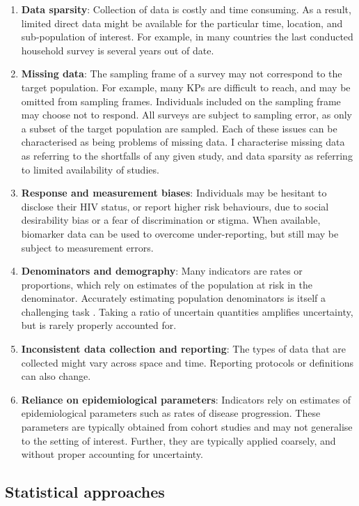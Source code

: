 \documentclass[a4paper, nobind]{templates/ociamthesis}
\providecommand{\tightlist}{%
  \setlength{\itemsep}{0pt}\setlength{\parskip}{0pt}}
\begin{document}
\begin{enumerate}
\def\labelenumi{\arabic{enumi}.}
\tightlist
\item
  \textbf{Data sparsity}:
  Collection of data is costly and time consuming.
  As a result, limited direct data might be available for the particular time, location, and sub-population of interest.
  For example, in many countries the last conducted household survey is several years out of date.
\item
  \textbf{Missing data}:
  The sampling frame of a survey may not correspond to the target population.
  For example, many KPs are difficult to reach, and may be omitted from sampling frames.
  Individuals included on the sampling frame may choose not to respond.
  All surveys are subject to sampling error, as only a subset of the target population are sampled.
  Each of these issues can be characterised as being problems of missing data.
  I characterise missing data as referring to the shortfalls of any given study, and data sparsity as referring to limited availability of studies.
\item
  \textbf{Response and measurement biases}:
  Individuals may be hesitant to disclose their HIV status, or report higher risk behaviours, due to social desirability bias or a fear of discrimination or stigma.
  When available, biomarker data can be used to overcome under-reporting, but still may be subject to measurement errors.
\item
  \textbf{Denominators and demography}:
  Many indicators are rates or proportions, which rely on estimates of the population at risk in the denominator.
  Accurately estimating population denominators is itself a challenging task \autocite{tatem2017worldpop}.
  Taking a ratio of uncertain quantities amplifies uncertainty, but is rarely properly accounted for.
\item
  \textbf{Inconsistent data collection and reporting}:
  The types of data that are collected might vary across space and time.
  Reporting protocols or definitions can also change.
\item
  \textbf{Reliance on epidemiological parameters}:
  Indicators rely on estimates of epidemiological parameters such as rates of disease progression.
  These parameters are typically obtained from cohort studies and may not generalise to the setting of interest.
  Further, they are typically applied coarsely, and without proper accounting for uncertainty.
\end{enumerate}

\hypertarget{statistical-approaches}{%
\subsection{Statistical approaches}\label{statistical-approaches}}
\end{document}
